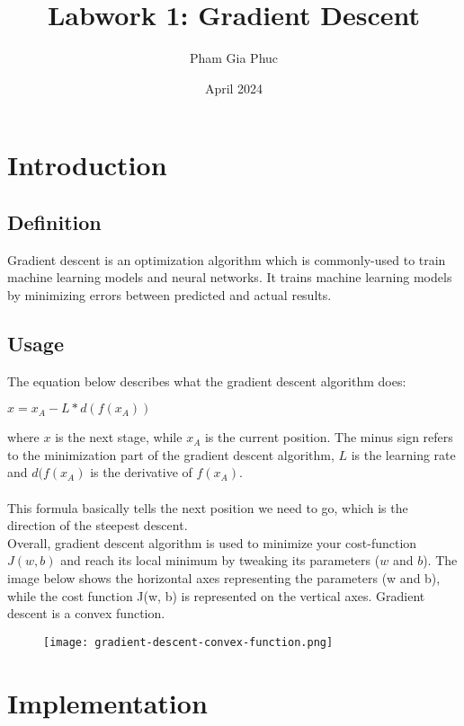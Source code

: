 \documentclass{article}
\title{Labwork 1: Gradient Descent}
\author{Pham Gia Phuc}
\date{April 2024}
\begin{document}
\maketitle

\setlength\parindent{0pt}

\section{Introduction}

\subsection{Definition}
Gradient descent is an optimization algorithm which is commonly-used to train machine learning models and neural networks. It trains machine learning models by minimizing errors between predicted and actual results.

\subsection{Usage}
The equation below describes what the gradient descent algorithm does:

\begin{center}
$x = x_A - L * d(f(x_A))$
\end{center}

where $x$ is the next stage, while $x_A$ is the current position. The minus sign refers to the minimization part of the gradient descent algorithm, $L$ is the learning rate and $d(f(x_A)$ is the derivative of $f(x_A)$.\\
\\
This formula basically tells the next position we need to go, which is the direction of the steepest descent.\\

Overall, gradient descent algorithm is used to minimize your cost-function $J(w, b)$ and reach its local minimum by tweaking its parameters ($w$ and $b$). The image below shows the horizontal axes representing the parameters (w and b), while the cost function J(w, b) is represented on the vertical axes. Gradient descent is a convex function.

\begin{figure}
    \centering
    \texttt{[image: gradient-descent-convex-function.png]}
    \label{fig:enter-label}
\end{figure}

\section{Implementation}
\end{document}
